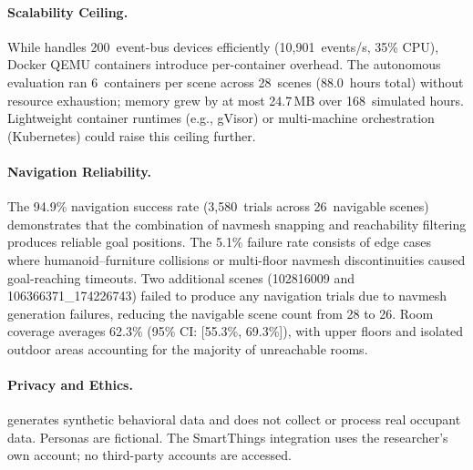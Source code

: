 \paragraph{Scalability Ceiling.}
While \sys{} handles 200~event-bus devices efficiently (10{,}901~events/s,
35\% CPU), Docker QEMU containers introduce per-container overhead.
The autonomous evaluation ran 6~containers per scene across
28~scenes (88.0~hours total) without resource exhaustion; memory
grew by at most 24.7\,MB over 168~simulated hours.  Lightweight
container runtimes (e.g., gVisor) or multi-machine orchestration
(Kubernetes) could raise this ceiling further.

\paragraph{Navigation Reliability.}
The 94.9\% navigation success rate (3{,}580~trials across 26~navigable
scenes) demonstrates that the combination of navmesh snapping and
reachability filtering produces reliable goal positions.  The 5.1\%
failure rate consists of edge cases where humanoid--furniture
collisions or multi-floor navmesh discontinuities caused
goal-reaching timeouts.  Two additional scenes (102816009 and
106366371\_174226743) failed to produce any navigation trials due
to navmesh generation failures, reducing the navigable scene count
from 28 to 26.  Room coverage averages 62.3\% (95\% CI: [55.3\%,
69.3\%]), with upper floors and isolated outdoor areas accounting
for the majority of unreachable rooms.

\paragraph{Privacy and Ethics.}
\sys{} generates synthetic behavioral data and does not collect or
process real occupant data.  Personas are fictional.  The SmartThings
integration uses the researcher's own account; no third-party
accounts are accessed.

